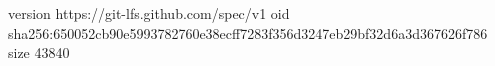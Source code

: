 version https://git-lfs.github.com/spec/v1
oid sha256:650052cb90e5993782760e38ecff7283f356d3247eb29bf32d6a3d367626f786
size 43840
